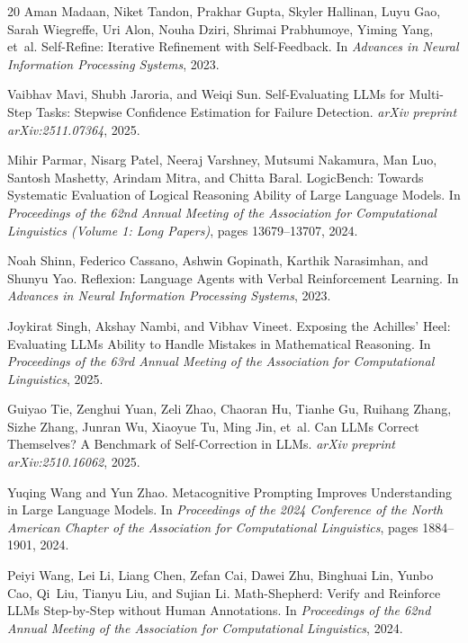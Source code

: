 \documentclass{article}
\begin{document}
\begin{thebibliography}{20}
Aman Madaan, Niket Tandon, Prakhar Gupta, Skyler Hallinan, Luyu Gao, Sarah Wiegreffe, Uri Alon, Nouha Dziri, Shrimai Prabhumoye, Yiming Yang, et~al.
\newblock Self-Refine: Iterative Refinement with Self-Feedback.
\newblock In \emph{Advances in Neural Information Processing Systems}, 2023.

Vaibhav Mavi, Shubh Jaroria, and Weiqi Sun.
\newblock Self-Evaluating {LLMs} for Multi-Step Tasks: Stepwise Confidence Estimation for Failure Detection.
\newblock \emph{arXiv preprint arXiv:2511.07364}, 2025.

Mihir Parmar, Nisarg Patel, Neeraj Varshney, Mutsumi Nakamura, Man Luo, Santosh Mashetty, Arindam Mitra, and Chitta Baral.
\newblock LogicBench: Towards Systematic Evaluation of Logical Reasoning Ability of Large Language Models.
\newblock In \emph{Proceedings of the 62nd Annual Meeting of the Association for Computational Linguistics (Volume 1: Long Papers)}, pages 13679--13707, 2024.

Noah Shinn, Federico Cassano, Ashwin Gopinath, Karthik Narasimhan, and Shunyu Yao.
\newblock Reflexion: Language Agents with Verbal Reinforcement Learning.
\newblock In \emph{Advances in Neural Information Processing Systems}, 2023.

Joykirat Singh, Akshay Nambi, and Vibhav Vineet.
\newblock Exposing the Achilles' Heel: Evaluating {LLMs} Ability to Handle Mistakes in Mathematical Reasoning.
\newblock In \emph{Proceedings of the 63rd Annual Meeting of the Association for Computational Linguistics}, 2025.

Guiyao Tie, Zenghui Yuan, Zeli Zhao, Chaoran Hu, Tianhe Gu, Ruihang Zhang, Sizhe Zhang, Junran Wu, Xiaoyue Tu, Ming Jin, et~al.
\newblock Can {LLMs} Correct Themselves? A Benchmark of Self-Correction in {LLMs}.
\newblock \emph{arXiv preprint arXiv:2510.16062}, 2025.

Yuqing Wang and Yun Zhao.
\newblock Metacognitive Prompting Improves Understanding in Large Language Models.
\newblock In \emph{Proceedings of the 2024 Conference of the North American Chapter of the Association for Computational Linguistics}, pages 1884--1901, 2024.

Peiyi Wang, Lei Li, Liang Chen, Zefan Cai, Dawei Zhu, Binghuai Lin, Yunbo Cao, Qi~Liu, Tianyu Liu, and Sujian Li.
\newblock Math-Shepherd: Verify and Reinforce {LLMs} Step-by-Step without Human Annotations.
\newblock In \emph{Proceedings of the 62nd Annual Meeting of the Association for Computational Linguistics}, 2024.


\end{thebibliography}
\end{document}
